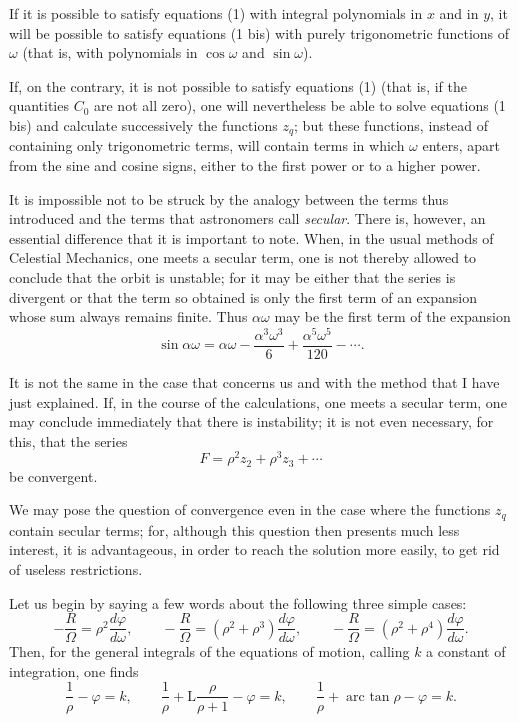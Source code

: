 \documentclass[11pt]{article}
\begin{document}
If it is possible to satisfy equations (1) with integral polynomials in $x$ and in $y$, it will be possible to satisfy equations (1 bis) with purely trigonometric functions of $\omega$ (that is, with polynomials in $\cos\omega$ and $\sin\omega$).

If, on the contrary, it is not possible to satisfy equations (1) (that is, if the quantities $C_0$ are not all zero), one will nevertheless be able to solve equations (1 bis) and calculate successively the functions $z_q$; but these functions, instead of containing only trigonometric terms, will contain terms in which $\omega$ enters, apart from the sine and cosine signs, either to the first power or to a higher power.

It is impossible not to be struck by the analogy between the terms thus introduced and the terms that astronomers call \emph{secular}. There is, however, an essential difference that it is important to note. When, in the usual methods of Celestial Mechanics, one meets a secular term, one is not thereby allowed to conclude that the orbit is unstable; for it may be either that the series is divergent or that the term so obtained is only the first term of an expansion whose sum always remains finite. Thus $\alpha\omega$ may be the first term of the expansion
\[
\sin\alpha\omega=\alpha\omega-\frac{\alpha^3\omega^3}{6}+\frac{\alpha^5\omega^5}{120}-\cdots.
\]

It is not the same in the case that concerns us and with the method that I have just explained. If, in the course of the calculations, one meets a secular term, one may conclude immediately that there is instability; it is not even necessary, for this, that the series
\[
F=\rho^2z_2+\rho^3z_3+\cdots
\]
be convergent.

We may pose the question of convergence even in the case where the functions $z_q$ contain secular terms; for, although this question then presents much less interest, it is advantageous, in order to reach the solution more easily, to get rid of useless restrictions.

Let us begin by saying a few words about the following three simple cases:
\[
-\frac{R}{\Omega}=\rho^2\frac{d\varphi}{d\omega},
\qquad
-\frac{R}{\Omega}=(\rho^2+\rho^3)\frac{d\varphi}{d\omega},
\qquad
-\frac{R}{\Omega}=(\rho^2+\rho^4)\frac{d\varphi}{d\omega}.
\]
Then, for the general integrals of the equations of motion, calling $k$ a constant of integration, one finds
\[
\frac1\rho-\varphi=k,
\qquad
\frac1\rho+\mathrm L\frac{\rho}{\rho+1}-\varphi=k,
\qquad
\frac1\rho+\operatorname{arc\ tan}\rho-\varphi=k.
\]
\end{document}
